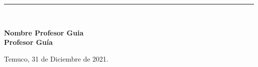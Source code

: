 \begin{titlepage}
{\begin{center}
\vspace*{0.5in}

\begin{flushright}
 \rule{65mm}{0.2mm}\\
\end{flushright}
\vspace*{-0.1in}
 \hspace*{3.5in} \textbf{Nombre Profesor Guia} \\
 \hspace*{3.5in} \textbf{Profesor Guía}

\vspace*{0.6in}

\begin{flushleft}
  Temuco, 31 de Diciembre de 2021.
\end{flushleft}

\end{center}
}
\end{titlepage}
